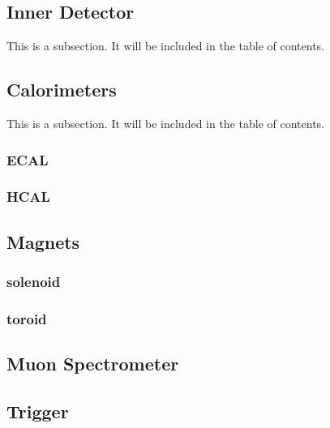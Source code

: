 \subsection{Inner Detector} \label{sec:ID} 

This is a subsection. It will be included in the table of contents. 

\subsection{Calorimeters} \label{sec:Calos} 

This is a subsection. It will be included in the table of contents. 

\subsubsection{ECAL} \label{sec:ECAL} 

\subsubsection{HCAL} \label{sec:HCAL} 

\subsection{Magnets} \label{sec:Magnets}

\subsubsection{solenoid} \label{sec:solenoid} 

\subsubsection{toroid} \label{sec:toroid} 

\subsection{Muon Spectrometer} \label{sec:Musyst}
 
\subsection{Trigger} \label{sec:Trigger}

